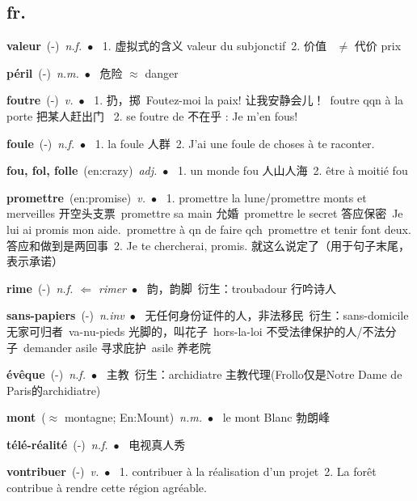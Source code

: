 \documentclass[10pt,a4paper,twoside]{article} %
\newcommand{\entry}[4]{\textbf{#1}\ {(#2)}\ \textit{#3}\ $\bullet$\ {#4}} %
\begin{document}
\begin{CJK*}{UTF8}{gkai}

\section*{fr.}

\begin{multicols}{2}



\entry{valeur}{-}{n.f.}
{
1. 虚拟式的含义 valeur du subjonctif\ 
2. 价值 \ 
$\neq$ 代价 prix 
}

\entry{péril}{-}{n.m.}
{
危险 $\approx$ danger
}

\entry{foutre}{-}{v.}
{
1. 扔，掷\ 
Foutez-moi la paix!  让我安静会儿！\ 
foutre qqn à la porte 把某人赶出门 \ 
2. se foutre de 不在乎 : Je m'en fous!
}

\entry{foule}{-}{n.f.}
{
1. la foule 人群\ 
2. J'ai une foule de choses à te raconter.
}

\entry{fou, fol, folle}{en:crazy}{adj.}
{
1. un monde fou 人山人海\ 
2. être à moitié fou
}

\entry{promettre}{en:promise}{v.}
{
1. promettre la lune/promettre monts et merveilles 开空头支票\ 
promettre sa main 允婚\ promettre le secret 答应保密\ Je lui ai promis mon aide.\ 
promettre à qn de faire qch\ promettre et tenir font deux. 答应和做到是两回事\  
2. Je te chercherai, promis. 就这么说定了（用于句子末尾，表示承诺）
}

\entry{rime}{-}{n.f. $\Leftarrow$ rimer}
{
韵，韵脚\ 
衍生：troubadour 行吟诗人
}

\entry{sans-papiers}{-}{n.inv}
{
无任何身份证件的人，非法移民\ 
衍生：sans-domicile 无家可归者\ 
va-nu-pieds 光脚的，叫花子\ 
hors-la-loi 不受法律保护的人/不法分子\ 
demander asile 寻求庇护\ 
asile 养老院\ 
}

\entry{évêque}{-}{n.f.}
{
主教\ 
衍生：archidiatre 主教代理(Frollo仅是Notre Dame de Paris的archidiatre)
}

\entry{mont}{$\approx$ montagne; En:Mount}{n.m.}
{
le mont Blanc 勃朗峰
}

\entry{télé-réalité}{-}{n.f.}
{
电视真人秀
}

\entry{vontribuer}{-}{v.}
{
1. contribuer à la réalisation d'un projet\ 
2. La forêt contribue à rendre cette région agréable. 
}


\end{multicols}
\end{CJK*}
\end{document}
